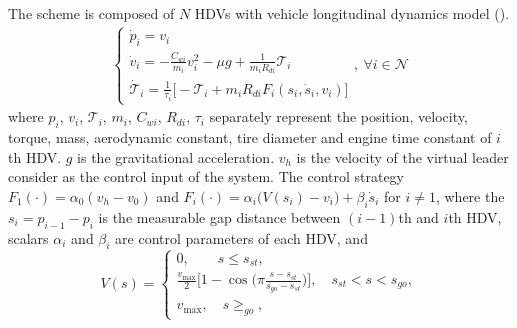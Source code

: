 \documentclass{ifacconf}
\begin{document}
The scheme is composed of $N$ HDVs with vehicle longitudinal dynamics model (\cite{rajamani2006vehicle}).
\begin{equation}
    \begin{aligned}
        \left\{\begin{array}{l}
    \dot{p}_i=v_i\\
    \dot{v}_i=-\frac{C_{wi}}{m_i} v_i^2-\mu g+\frac{1}{m_iR_{di}}\mathcal{T}_i\\
    \dot{\mathcal{T}}_i=\frac{1}{\tau_i}\Big[-\mathcal{T}_i+m_iR_{di}F_i(s_i,\dot{s}_i,v_i)\Big]
\end{array}\right.,\ \forall i\in\mathcal{N}
    \end{aligned}
\end{equation}
where $p_i$, $v_i$, $\mathcal{T}_i$, $m_i$, $C_{wi}$, $R_{di}$, $\tau_i$ separately represent the position, velocity, torque, mass, aerodynamic constant, tire diameter and engine time constant of $i$th HDV. $g$ is the gravitational acceleration. $v_h$ is the velocity of the virtual leader consider as the control input of the system. The control strategy $F_{1}(\cdot)=\alpha_{0}(v_h-v_{0})$ and $F_i(\cdot)=\alpha_i\big(V(s_i)-v_i\big)+\beta_i\dot{s}_i$ for $i\ne1$, where the $s_i=p_{i-1}-p_{i}$ is the measurable gap distance between $(i-1)$th and $i$th HDV, scalars $\alpha_i$ and $\beta_i$ are control parameters of each HDV, and
\[V(s)=\left\{\begin{array}{l}0,\quad\quad s\le s_{st},\\\frac{v_{\max}}{2}\Big[1-\cos\Big(\pi\frac{s-s_{st}}{s_{go}-s_{st}}\Big)\Big],\quad s_{st}<s<s_{go},
\\v_{\max},\quad s\ge_{go},\end{array}\right.\] 
\end{document}
